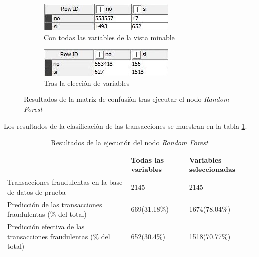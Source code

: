 \begin{figure}[H]
	\centering
	\begin{subfigure}[b]{0.49\linewidth}
		\centering
		\includegraphics[width=\linewidth]{"figuras/Ray/Bosque aleatorio/Todas las variables/Resultados del nodo matriz Score"}
		\caption{Con todas las variables de la vista minable}
		\label{fig:res-del-nodo-matriz-score}
	\end{subfigure}
	\hfill
	
	\begin{subfigure}[b]{0.49\linewidth}
		\centering
		\includegraphics[width=\linewidth]{"figuras/Ray/Bosque aleatorio/Variables importantes/Resultados del nodo matriz Score"}
		\caption{Tras la elección de variables}
		\label{fig:resultados-del-nodo-matriz-score}
	\end{subfigure}
	\caption{Resultados de la matriz de confusión tras ejecutar el nodo \textit{Random Forest}}
	\label{fig:matriz-random}
\end{figure}

Los resultados de la clasificación de las transacciones se muestran en la tabla \ref{tabla:res-clas-random-vm}.

\begin{table} [H]
	\centering
	\begin{tabular}{p{6cm} | l | l}
		\toprule
		& Todas las variables & Variables seleccionadas \\
		\midrule
		Transacciones fraudulentas en la base de datos de prueba &	2145 & 2145\\
		\hline
		Predicción de las transacciones fraudulentas (\% del total) &	669(31.18\%) & 1674(78.04\%) \\
		\hline
		Predicción efectiva de las transacciones fraudulentas (\% del total)	& 	652(30.4\%) & 1518(70.77\%) \\
		\bottomrule
	\end{tabular}
	\caption{Resultados de la ejecución del nodo \textit{Random Forest}}
	\label{tabla:res-clas-random-vm}
\end{table}

